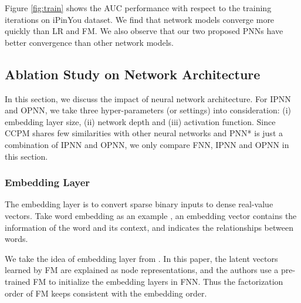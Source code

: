 \documentclass[conference]{IEEEtran}
\begin{document}
Figure \ref{fig:train} shows the AUC performance with respect to the training iterations on iPinYou dataset. We find that network models converge more quickly than LR and FM. We also observe that our two proposed PNNs have better convergence than other network models.

\subsection{Ablation Study on Network Architecture}\label{sec:arch}
In this section, we discuss the impact of neural network architecture.
For IPNN and OPNN,
we take three hyper-parameters (or settings) into consideration:
(i) embedding layer size, (ii) network depth and (iii) activation function. Since CCPM shares few similarities with other neural networks and PNN* is just a combination of IPNN and OPNN, we only compare FNN, IPNN and OPNN in this section.

\subsubsection{Embedding Layer}
The embedding layer is to convert sparse binary inputs to dense real-value vectors.
Take word embedding as an example \cite{mikolov2013distributed},
an embedding vector contains the information of the word and its context, and indicates the relationships between words.

We take the idea of embedding layer from \cite{zhang2016deep}. In this paper, the latent vectors learned by FM are explained as node representations, and the authors use a pre-trained FM to initialize the embedding layers in FNN. Thus the factorization order of FM keeps consistent with the embedding order.
\end{document}
